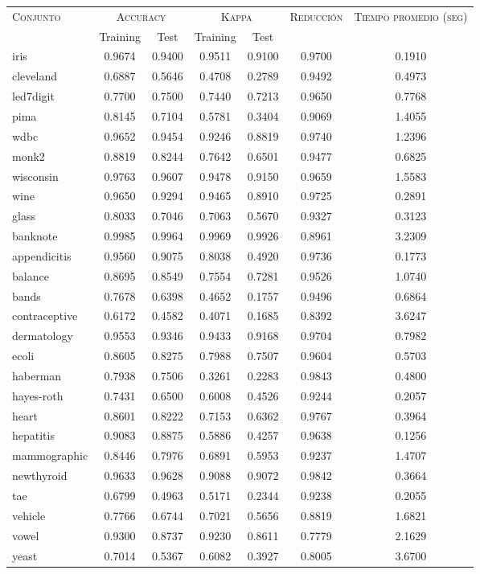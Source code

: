 \begin{table}[]
\centering
\begin{tabular}{l c c c c c c}
\hline
\multirow{2}{*}{\textsc{Conjunto}}
	& \multicolumn{2}{c}{\textsc{Accuracy}}
	& \multicolumn{2}{c}{\textsc{Kappa}}
	& \textsc{Reducción}
	& \textsc{Tiempo promedio (seg)} \\
	& Training & Test
	& Training & Test \\ 
\hline
\hline

iris & 0.9674 & 0.9400 & 0.9511 & 0.9100 & 0.9700 & 0.1910 \\
cleveland & 0.6887 & 0.5646 & 0.4708 & 0.2789 & 0.9492 & 0.4973 \\
led7digit & 0.7700 & 0.7500 & 0.7440 & 0.7213 & 0.9650 & 0.7768 \\
pima & 0.8145 & 0.7104 & 0.5781 & 0.3404 & 0.9069 & 1.4055 \\
wdbc & 0.9652 & 0.9454 & 0.9246 & 0.8819 & 0.9740 & 1.2396 \\
monk2 & 0.8819 & 0.8244 & 0.7642 & 0.6501 & 0.9477 & 0.6825 \\
wisconsin & 0.9763 & 0.9607 & 0.9478 & 0.9150 & 0.9659 & 1.5583 \\
wine & 0.9650 & 0.9294 & 0.9465 & 0.8910 & 0.9725 & 0.2891 \\
glass & 0.8033 & 0.7046 & 0.7063 & 0.5670 & 0.9327 & 0.3123 \\
banknote & 0.9985 & 0.9964 & 0.9969 & 0.9926 & 0.8961 & 3.2309 \\
appendicitis & 0.9560 & 0.9075 & 0.8038 & 0.4920 & 0.9736 & 0.1773 \\
balance & 0.8695 & 0.8549 & 0.7554 & 0.7281 & 0.9526 & 1.0740 \\
bands & 0.7678 & 0.6398 & 0.4652 & 0.1757 & 0.9496 & 0.6864 \\
contraceptive & 0.6172 & 0.4582 & 0.4071 & 0.1685 & 0.8392 & 3.6247 \\
dermatology & 0.9553 & 0.9346 & 0.9433 & 0.9168 & 0.9704 & 0.7982 \\
ecoli & 0.8605 & 0.8275 & 0.7988 & 0.7507 & 0.9604 & 0.5703 \\
haberman & 0.7938 & 0.7506 & 0.3261 & 0.2283 & 0.9843 & 0.4800 \\
hayes-roth & 0.7431 & 0.6500 & 0.6008 & 0.4526 & 0.9244 & 0.2057 \\
heart & 0.8601 & 0.8222 & 0.7153 & 0.6362 & 0.9767 & 0.3964 \\
hepatitis & 0.9083 & 0.8875 & 0.5886 & 0.4257 & 0.9638 & 0.1256 \\
mammographic & 0.8446 & 0.7976 & 0.6891 & 0.5953 & 0.9237 & 1.4707 \\
newthyroid & 0.9633 & 0.9628 & 0.9088 & 0.9072 & 0.9842 & 0.3664 \\
tae & 0.6799 & 0.4963 & 0.5171 & 0.2344 & 0.9238 & 0.2055 \\
vehicle & 0.7766 & 0.6744 & 0.7021 & 0.5656 & 0.8819 & 1.6821 \\
vowel & 0.9300 & 0.8737 & 0.9230 & 0.8611 & 0.7779 & 2.1629 \\
yeast & 0.7014 & 0.5367 & 0.6082 & 0.3927 & 0.8005 & 3.6700 \\


\end{tabular}
\end{table}
